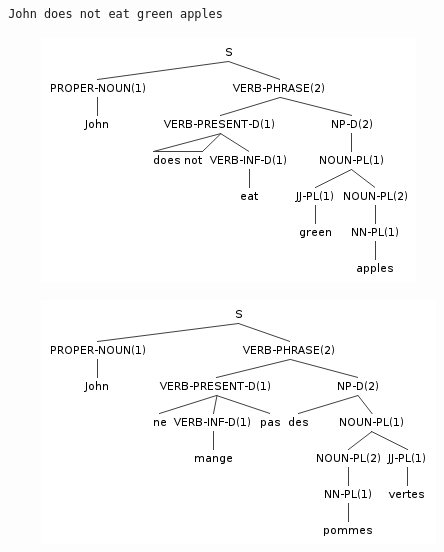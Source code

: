 \documentclass[11pt]{article}
\begin{document}
\begin{verbatim} John does not eat green apples \end{verbatim}
\begin{figure}[H]
\includegraphics[scale=0.8]{john-does-not-eat-green-apples.png}
\end{figure}
\begin{figure}[H]
\includegraphics[scale=0.8]{john-ne-mange-pas-des-pommes-vertes.png}
\end{figure}
\end{document}
